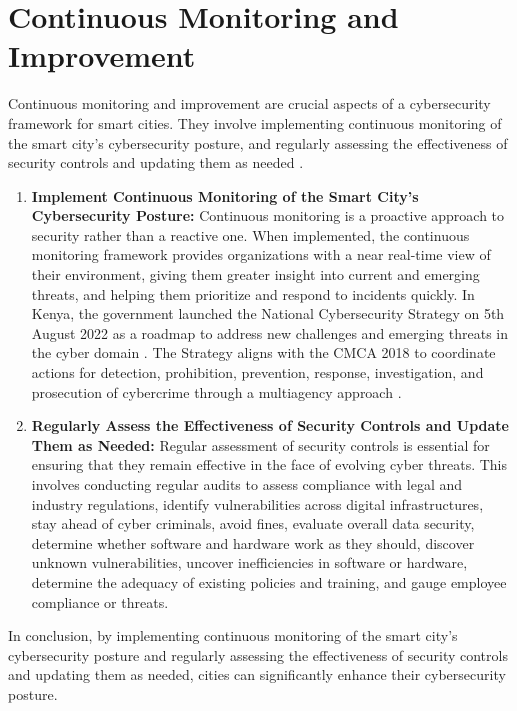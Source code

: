 \documentclass{article}
\begin{document}
\section{Continuous Monitoring and Improvement}
Continuous monitoring and improvement are crucial aspects of a cybersecurity framework for smart cities. They involve implementing continuous monitoring of the smart city’s cybersecurity posture, and regularly assessing the effectiveness of security controls and updating them as needed \cite{allage-2023}\cite{secureframe-2023}\cite{cybersecurity-automation-2021}.
\begin{enumerate}[label=\alph*)]
    \item \textbf{Implement Continuous Monitoring of the Smart City’s Cybersecurity Posture:} Continuous monitoring is a proactive approach to security rather than a reactive one\cite{cybersecurity-automation-2021}. When implemented, the continuous monitoring framework provides organizations with a near real-time view of their environment, giving them greater insight into current and emerging threats, and helping them prioritize and respond to incidents quickly\cite{cybersecurity-automation-2021}. In Kenya, the government launched the National Cybersecurity Strategy on 5th August 2022 as a roadmap to address new challenges and emerging threats in the cyber domain \cite{national-computer-and-cybercrimes-coordination-committee-no-date}. The Strategy aligns with the CMCA 2018 to coordinate actions for detection, prohibition, prevention, response, investigation, and prosecution of cybercrime through a multiagency approach \cite{national-computer-and-cybercrimes-coordination-committee-no-date}.
    \item \textbf{Regularly Assess the Effectiveness of Security Controls and Update Them as Needed:} Regular assessment of security controls is essential for ensuring that they remain effective in the face of evolving cyber threats\cite{allage-2023}\cite{secureframe-2023}\cite{cybersecurity-automation-2021}. This involves conducting regular audits to assess compliance with legal and industry regulations, identify vulnerabilities across digital infrastructures, stay ahead of cyber criminals, avoid fines, evaluate overall data security, determine whether software and hardware work as they should, discover unknown vulnerabilities, uncover inefficiencies in software or hardware, determine the adequacy of existing policies and training, and gauge employee compliance or threats.
    


\end{enumerate}
In conclusion, by implementing continuous monitoring of the smart city’s cybersecurity posture and regularly assessing the effectiveness of security controls and updating them as needed, cities can significantly enhance their cybersecurity posture\cite{allage-2023}\cite{secureframe-2023}\cite{cybersecurity-automation-2021}.
\end{document}
